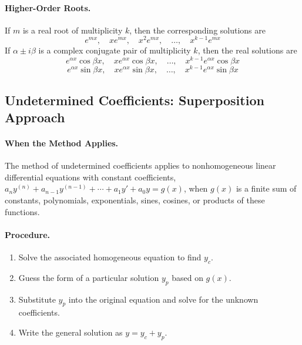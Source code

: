 \documentclass[oneside]{book}
\begin{document}
\paragraph{Higher-Order Roots.}
If $m$ is a real root of multiplicity $k$, then the corresponding solutions are
\[
    e^{mx},\quad xe^{mx},\quad x^2e^{mx},\quad \ldots,\quad x^{k-1}e^{mx}
\]
If $\alpha\pm i\beta$ is a complex conjugate pair of multiplicity $k$, then the
real solutions are
\[
    e^{\alpha x}\cos \beta x,\quad xe^{\alpha x}\cos \beta x,
    \quad \ldots,\quad x^{k-1}e^{\alpha x}\cos \beta x
\]
\[
    e^{\alpha x}\sin \beta x,\quad xe^{\alpha x}\sin \beta x,
    \quad \ldots,\quad x^{k-1}e^{\alpha x}\sin \beta x
\]

\subsection{Undetermined Coefficients: Superposition Approach}

\paragraph{When the Method Applies.}
The method of undetermined coefficients applies to nonhomogeneous linear
differential equations with constant coefficients, $a_ny^{(n)}+a_{n-1}y^{(n-1)}+\cdots+a_1y'+a_0y=g(x)$, when $g(x)$ is a finite sum of constants, polynomials, exponentials, sines, cosines, or products of these functions.

\paragraph{Procedure.}
\begin{enumerate}
    \item Solve the associated homogeneous equation to find $y_c$.
    \item Guess the form of a particular solution $y_p$ based on $g(x)$.
    \item Substitute $y_p$ into the original equation and solve for the unknown coefficients.
    \item Write the general solution as $y=y_c+y_p$.
\end{enumerate}
\end{document}
